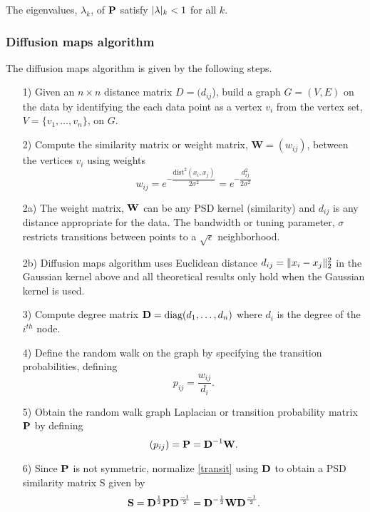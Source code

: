 The eigenvalues, $\lambda_{k}$, of $\textbf{P}$ satisfy $\lvert\lambda\rvert_{k} < 1$
for all $k$.

\subsubsection{Diffusion maps algorithm}
The diffusion maps algorithm is given by the following steps.
\begin{itemize}
\item[1)] Given an $n \times n$ distance matrix $D = (d_{ij}$), build a graph $G = (V,E)$ on the data by identifying the each data point
as a vertex $v_{i}$ from the vertex set, $V = \{v_{1}, \ldots, v_{n}\}$, on  $G$.
\item[2)] Compute the similarity matrix or weight matrix, $\bm{W} = (w_{ij})$, between the vertices $v_{i}$ using weights
\[
w_{ij} = e^{-\dfrac{\text{dist}^{2}(x_{i}, x_{j})}{2\sigma^2}} 
= e^{-\dfrac{d_{ij}^{2}}{2\sigma^2}}
\] 
\item[2a)] The weight matrix, $\textbf{W}$ can be any PSD kernel (similarity) and $d_{ij}$ is any distance appropriate for the data. The bandwidth or tuning parameter, $\sigma$ restricts transitions between points to a $\sqrt{\epsilon}$ neighborhood.
\item[2b)] Diffusion maps algorithm uses Euclidean distance 
$d_{ij} = \lVert x_{i} - x_{j}\rVert^{2}_{2}$ in the Gaussian kernel above
and all theoretical results only hold when the Gaussian kernel is used.
\item[3)] Compute degree matrix $\textbf{D} = \text{diag}(d_{1}, \ldots, d_{n})$
where $d_{i}$ is the degree of the $i^{th}$ node.
\item[4)] Define the random walk on the graph by specifying the transition probabilities, defining 
\[
p_{ij} = \frac{w_{ij}}{d_{i}}.
\]
\item[5)] Obtain the random walk graph Laplacian or transition probability
matrix $\textbf{P}$ by defining 
\begin{equation}\label{transit} 
(p_{ij}) = \textbf{P} = \textbf{D}^{-1}\textbf{W}.
\end{equation}

\item[6)] Since $\textbf{P}$ is not symmetric, normalize \eqref{transit}
using $\textbf{D}$ to obtain a PSD similarity matrix S given by
\begin{equation}\label{simPSD}
\textbf{S} = \textbf{D}^{\frac{1}{2}}\textbf{P}\textbf{D}^{\frac{-1}{2}} = \textbf{D}^{-\frac{1}{2}}\textbf{W}\textbf{D}^{\frac{-1}{2}}. 
\end{equation} 


\end{itemize}
